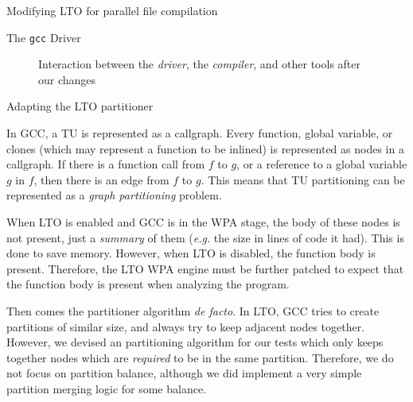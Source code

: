 \begin{section}{Modifying LTO for parallel file compilation}
\begin{subsection}{The \texttt{gcc} Driver}
\begin{figure}
{{
}
}%
\caption{Interaction between the \textit{driver}, the \textit{compiler}, and other tools
after our changes}
\label{fig:gnu_toolchain_patched}
\end{figure}

\end{subsection}

\begin{subsection}{Adapting the LTO partitioner}\label{sec:lto_partitioner}

In GCC, a TU is represented as a callgraph. Every function, global variable, or
clones (which may represent a function to be inlined) is represented as nodes
in a callgraph. If there is a function call from $f$ to $g$, or a
reference to a global variable $g$ in $f$, then there is an edge from $f$ to
$g$. This means that TU partitioning can be represented as a \emph{graph
partitioning} problem.

When LTO is enabled and GCC is in the WPA stage, the body of these nodes
is not present, just a \textit{summary} of them (\textit{e.g.} the size
in lines of code it had). This is done to save memory. However,
when LTO is disabled, the function body is present. Therefore,
the LTO WPA engine must be further patched to expect that the function
body is present when analyzing the program. 

Then comes the partitioner algorithm \textit{de facto}. In LTO, GCC tries to
create partitions of similar size, and always try to keep adjacent nodes together.
However, we devised an partitioning algorithm for our tests which only keeps
together nodes which are \textit{required} to be in the same partition. Therefore,
we do not focus on partition balance, although we did implement a very simple
partition merging logic for some balance.


\end{subsection}
\end{section}
